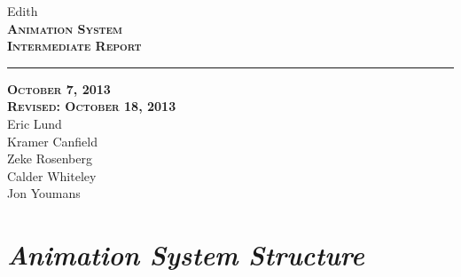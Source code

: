 \documentclass[12pt]{article}
\begin{document}
\begin{titlepage}
	\begin{center}
	\huge  Edith \\
	\vspace*{\fill}%
 	\huge \textsc{\textbf{Animation System \\Intermediate Report} }	
	\bigskip 
	\rule{130mm}{.1pt}
	\textsc{\textbf{October 7, 2013 \\ Revised: October 18, 2013} \\ }	
	\vspace*{\fill}%
	Eric Lund \\
	Kramer Canfield \\ 
	Zeke Rosenberg \\
	Calder Whiteley \\
	Jon Youmans
	\end{center}
\end{titlepage}

\section{\emph{Animation System Structure}}%
\end{document}
